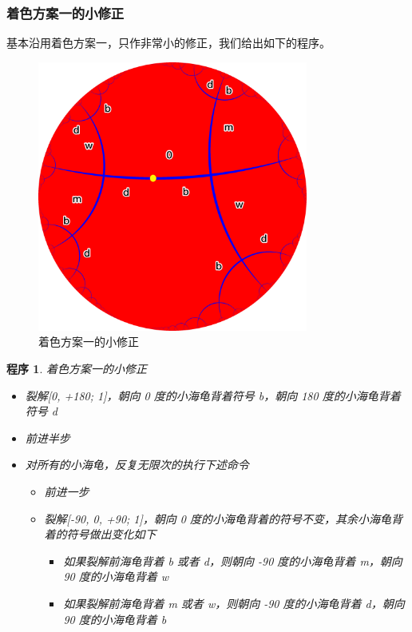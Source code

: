 \documentclass[a4paper,12pt]{article}
\newtheorem{program}{程序}
\begin{document}
\subsubsection{着色方案一的小修正}

基本沿用着色方案一，只作非常小的修正，我们给出如下的程序。

\begin{figure}[ht]
\centering
\includegraphics[width=3.5in]{images/H2_tiling_with_color_2.png}
\caption{着色方案一的小修正}
\end{figure}

\begin{program}
着色方案一的小修正
\begin{itemize}
\item 裂解[0, +180; 1]，朝向 0 度的小海龟背着符号 b，朝向 180 度的小海龟背着符号 d
\item 前进半步
\item 对所有的小海龟，反复无限次的执行下述命令
\begin{itemize}
  \item 前进一步
  \item 裂解[-90, 0, +90; 1]，朝向 0 度的小海龟背着的符号不变，其余小海龟背着的符号做出变化如下
    \begin{itemize}
      \item 如果裂解前海龟背着 b 或者 d，则朝向 -90 度的小海龟背着 m，朝向 90 度的小海龟背着 w
      \item 如果裂解前海龟背着 m 或者 w，则朝向 -90 度的小海龟背着 d，朝向 90 度的小海龟背着 b
    \end{itemize}
  \end{itemize}
\end{itemize}
\end{program}
\end{document}
